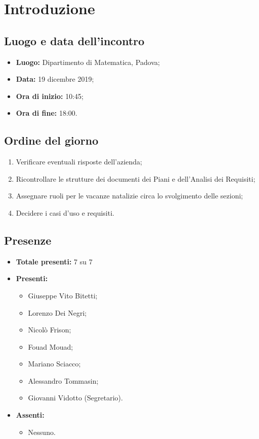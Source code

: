 \section*{Introduzione}

\subsection*{Luogo e data dell'incontro}
	\begin{itemize}
		\item \textbf{Luogo:} Dipartimento di Matematica, Padova;
		\item \textbf{Data:} 19 dicembre 2019;
		\item \textbf{Ora di inizio:} 10:45;
		\item \textbf{Ora di fine:} 18:00.
	\end{itemize}

\subsection*{Ordine del giorno}
	\begin{enumerate}
		\item Verificare eventuali risposte dell'azienda;
		\item  Ricontrollare le strutture dei documenti dei Piani e dell'Analisi dei Requisiti;
		\item  Assegnare ruoli per le vacanze natalizie circa lo svolgimento delle sezioni;
		\item  Decidere i casi d'uso e requisiti.
	\end{enumerate}

\subsection*{Presenze}
	\begin{itemize}
		\item \textbf{Totale presenti:} 7 su 7
		\item \textbf{Presenti: }
			\begin{itemize}			
				\item Giuseppe Vito Bitetti;
				\item Lorenzo Dei Negri;
				\item Nicolò Frison;
				\item Fouad Mouad;
				\item Mariano Sciacco;
				\item Alessandro Tommasin;
				\item Giovanni Vidotto (Segretario).
			\end{itemize}
		\item \textbf{Assenti: } 
			\begin{itemize}	
				\item Nessuno.
			\end{itemize}
	\end{itemize}


